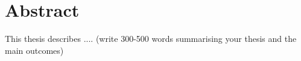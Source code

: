 \chapter*{Abstract}

This thesis describes .... (write 300-500 words summarising your thesis and the main outcomes)
